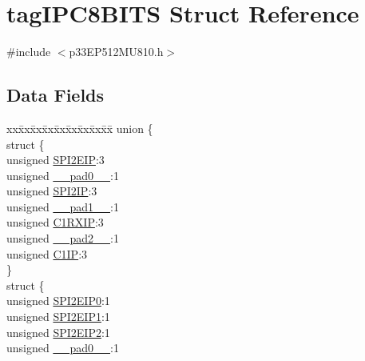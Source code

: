 \hypertarget{structtag_i_p_c8_b_i_t_s}{}\section{tag\+I\+P\+C8\+B\+I\+TS Struct Reference}
\label{structtag_i_p_c8_b_i_t_s}


{\ttfamily \#include $<$p33\+E\+P512\+M\+U810.\+h$>$}

\subsection*{Data Fields}
\begin{DoxyCompactItemize}
\item 
\begin{tabbing}
xx\=xx\=xx\=xx\=xx\=xx\=xx\=xx\=xx\=\kill
union \{\\
\>struct \{\\
\>\>unsigned \hyperlink{structtag_i_p_c8_b_i_t_s_a737c558fd76b6d95496e4fd1949ffed7}{SPI2EIP}:3\\
\>\>unsigned \hyperlink{structtag_i_p_c8_b_i_t_s_adf71f3d8410c1f1dbbc96680a92c49af}{\_\_pad0\_\_}:1\\
\>\>unsigned \hyperlink{structtag_i_p_c8_b_i_t_s_aec0a7b747db8f52153fc3722575da777}{SPI2IP}:3\\
\>\>unsigned \hyperlink{structtag_i_p_c8_b_i_t_s_acaf2d0924a107ec6e8d2e31febaf66f9}{\_\_pad1\_\_}:1\\
\>\>unsigned \hyperlink{structtag_i_p_c8_b_i_t_s_a85b908d8920bafd29e7f92c9c0d71bd3}{C1RXIP}:3\\
\>\>unsigned \hyperlink{structtag_i_p_c8_b_i_t_s_a4d97cc5f7d51d22fc2bf3eab35c9cb7f}{\_\_pad2\_\_}:1\\
\>\>unsigned \hyperlink{structtag_i_p_c8_b_i_t_s_a53c6500132cc9a5f40446dcb16be83cb}{C1IP}:3\\
\>\} \\
\>struct \{\\
\>\>unsigned \hyperlink{structtag_i_p_c8_b_i_t_s_a00d23dc412dec48af041edd74e6f2053}{SPI2EIP0}:1\\
\>\>unsigned \hyperlink{structtag_i_p_c8_b_i_t_s_a5c6354f3da4297c4bb12b2af3c290dbf}{SPI2EIP1}:1\\
\>\>unsigned \hyperlink{structtag_i_p_c8_b_i_t_s_a690b72372fadcb418e6fbcaac8f6d1f7}{SPI2EIP2}:1\\
\>\>unsigned \hyperlink{structtag_i_p_c8_b_i_t_s_adf71f3d8410c1f1dbbc96680a92c49af}{\_\_pad0\_\_}:1\\

\end{tabbing}
\end{DoxyCompactItemize}
